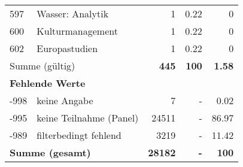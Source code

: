\begin{longtable}{lXrrr}
        597 & \multicolumn{1}{X}{Wasser: Analytik} & %
          \num{1} &
          \num[round-mode=places,round-precision=2]{0.22} &
          \num[round-mode=places,round-precision=2]{0} \\

        600 & \multicolumn{1}{X}{Kulturmanagement} & %
          \num{1} &
          \num[round-mode=places,round-precision=2]{0.22} &
          \num[round-mode=places,round-precision=2]{0} \\

        602 & \multicolumn{1}{X}{Europastudien} & %
          \num{1} &
          \num[round-mode=places,round-precision=2]{0.22} &
          \num[round-mode=places,round-precision=2]{0} \\

     \midrule
     \multicolumn{2}{l}{Summe (gültig)} &
       \textbf{\num{445}} &
     \textbf{100} &
       \textbf{\num[round-mode=places,round-precision=2]{1.58}} \\
     \multicolumn{5}{l}{\textbf{Fehlende Werte}}\\
       -998 &
       keine Angabe &
         \num{7} &
        - &
         \num[round-mode=places,round-precision=2]{0.02} \\
       -995 &
       keine Teilnahme (Panel) &
         \num{24511} &
        - &
         \num[round-mode=places,round-precision=2]{86.97} \\
       -989 &
       filterbedingt fehlend &
         \num{3219} &
        - &
         \num[round-mode=places,round-precision=2]{11.42} \\
     \midrule
     \multicolumn{2}{l}{\textbf{Summe (gesamt)}} &
          \textbf{\num{28182}} &
        \textbf{-} &
        \textbf{100} \\
     \bottomrule
     \end{longtable}
     
